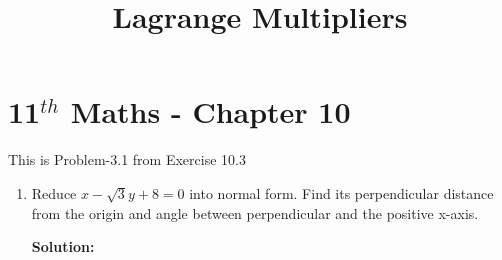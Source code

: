 \documentclass[12pt]{article}
\newcommand{\solution}{\noindent \textbf{Solution: }}
\begin{document}
\begin{center}
\title{\textbf{Lagrange Multipliers}}
\date{\vspace{-5ex}} %
\maketitle
\end{center}
\setcounter{page}{1}

\section{11$^{th}$ Maths - Chapter 10}
This is Problem-3.1 from Exercise 10.3 
\begin{enumerate}
\item Reduce $x-\sqrt{3}y+8=0$ into normal form. Find its perpendicular distance from the origin and angle between perpendicular and the positive x-axis. 

\solution 


\end{enumerate}
\end{document}
